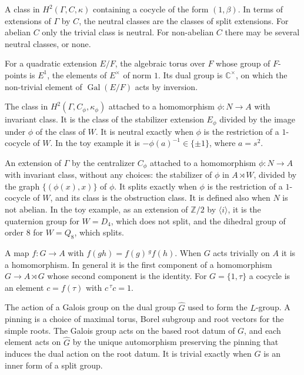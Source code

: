 \documentclass[12pt,letterpaper]{article}
\numberwithin{equation}{section}
\theoremstyle{plain}
\theoremstyle{definition}
\newcommand{\Z}{\mathbb{Z}}
\newcommand{\C}{\mathbb{C}}
\newcommand{\Gh}{\widehat{G}}
\newcommand{\act}[2]{{}^{#1}\!#2}          %
\DeclareMathOperator{\Gal}{Gal}
\begin{document}
\begin{description}[itemsep=3pt,leftmargin=1.5em,style=unboxed]
\item[Neutral class.] A class in $H^2(\Gamma,C,\kappa)$ containing a
cocycle of the form $(1,\beta)$. In terms of extensions of $\Gamma$ by
$C$, the neutral classes are the classes of split extensions. For abelian
$C$ only the trivial class is neutral. For non-abelian $C$ there may be
several neutral classes, or none.

\item[Norm-one torus.] For a quadratic extension $E/F$, the algebraic
torus over $F$ whose group of $F$-points is $E^1$, the elements of
$E^\times$ of norm $1$. Its dual group is $\C^\times$, on which the
non-trivial element of $\Gal(E/F)$ acts by inversion.

\item[Obstruction class $\partial\phi$.] The class in
$H^2(\Gamma,C_\phi,\kappa_\phi)$ attached to a homomorphism $\phi:N\to A$
with invariant class. It is the class of the stabilizer extension $E_\phi$
divided by the image under $\phi$ of the class of $W$. It is neutral
exactly when $\phi$ is the restriction of a $1$-cocycle of $W$. In the toy
example it is $-\phi(a)^{-1}\in\{\pm1\}$, where $a=s^2$.

\item[Obstruction extension $\mathcal{O}_\phi$.] An extension of $\Gamma$
by the centralizer $C_\phi$ attached to a homomorphism $\phi:N\to A$ with
invariant class, without any choices: the stabilizer of $\phi$ in
$A\rtimes W$, divided by the graph $\{(\phi(x),x)\}$ of $\phi$. It splits
exactly when $\phi$ is the restriction of a $1$-cocycle of $W$, and its
class is the obstruction class. It is defined also when $N$ is not
abelian. In the toy example, as an extension of $\Z/2$ by
$\langle i\rangle$, it is the quaternion group for $W=D_4$, which does not
split, and the dihedral group of order $8$ for $W=Q_8$, which splits.

\item[$1$-cocycle.] A map $f:G\to A$ with
$f(gh)=f(g)\,\act{g}{f(h)}$. When $G$ acts trivially on $A$ it is a
homomorphism. In general it is the first component of a homomorphism
$G\to A\rtimes G$ whose second component is the identity. For
$G=\{1,\tau\}$ a cocycle is an element $c=f(\tau)$ with
$c\,\act{\tau}{c}=1$.

\item[Pinned action.] The action of a Galois group on the dual group
$\Gh$ used to form the $L$-group. A pinning is a choice of maximal torus,
Borel subgroup and root vectors for the simple roots. The Galois group
acts on the based root datum of $G$, and each element acts on $\Gh$ by the
unique automorphism preserving the pinning that induces the dual action
on the root datum. It is trivial exactly when $G$ is an inner form of a
split group.


\end{description}
\end{document}
